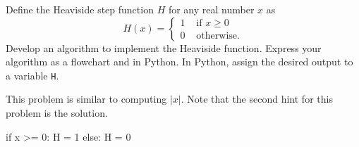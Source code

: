 \documentclass{ximera}
\begin{document}
\begin{question}
Define the Heaviside step function $H$ for any real number $x$ as
	$$H(x)=\begin{cases} 1 &\text{ if $x\geq 0$}\\
		0 &\text{ otherwise.}
	\end{cases}$$
Develop an algorithm to implement the Heaviside function. Express your algorithm as a flowchart and in Python. In Python, assign the desired output to a variable \verb|H|.
	\begin{hint}
		This problem is similar to computing $|x|$. Note that the second hint for this problem is the solution.
	\end{hint}
	\begin{hint}
	\begin{center}
	\end{center}
\begin{sageCell}
if x >= 0:
        H = 1
else:
        H = 0
\end{sageCell}
	\end{hint}
\end{question}
\end{document}
